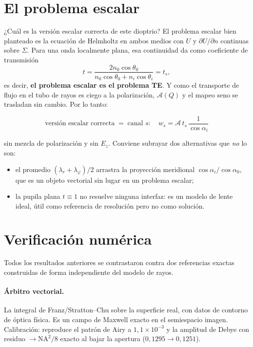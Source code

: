 \documentclass[11pt,a4paper]{article}
\begin{document}
\section{El problema escalar}
\label{sec:escalar}

¿Cuál es la versión escalar correcta de este dioptrio? El problema escalar bien
planteado es la ecuación de Helmholtz en ambos medios con $U$ y $\partial U/\partial n$
continuas sobre $\Sigma$. Para una onda localmente plana, esa continuidad da
como coeficiente de transmisión
\begin{equation}
  t=\frac{2n_0\cos\theta_0}{n_0\cos\theta_0+n_i\cos\theta_i}=t_s ,
\end{equation}
es decir, \textbf{el problema escalar es el problema TE}. Y como el transporte
de flujo en el tubo de rayos es ciego a la polarización, $\mathcal{A}(Q)$ y el
mapeo seno se trasladan sin cambio. Por lo tanto:

\begin{equation}
  \boxed{\;\text{versión escalar correcta}\;=\;
  \text{canal } s:\quad w_s=\mathcal{A}\,t_s\,\frac{1}{\cos\alpha_i}\;}
\end{equation}

sin mezcla de polarización y sin $E_z$. Conviene subrayar dos alternativas que
\emph{no} lo son:
\begin{itemize}
  \item el promedio $(\lambda_r+\lambda_\varphi)/2$ arrastra la proyección
    meridional $\cos\alpha_i/\cos\alpha_0$, que es un objeto vectorial sin
    lugar en un problema escalar;
  \item la pupila plana $t\equiv1$ no resuelve ninguna interfaz: es un modelo
    de lente ideal, útil como referencia de resolución pero no como solución.
\end{itemize}

\section{Verificación numérica}
\label{sec:verif}

Todos los resultados anteriores se contrastaron contra dos referencias
exactas construidas de forma independiente del modelo de rayos.

\paragraph{Árbitro vectorial.} La integral de Franz/Stratton--Chu sobre la
superficie real, con datos de contorno de óptica física. Es un campo de
Maxwell exacto en el semiespacio imagen. Calibración: reproduce el patrón de
Airy a $1{,}1\times10^{-3}$ y la amplitud de Debye con residuo
$\to \mathrm{NA}^2/8$ exacto al bajar la apertura ($0{,}1295\to0{,}1251$).
\end{document}

